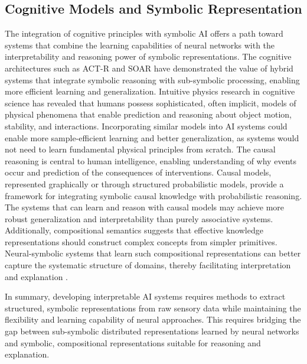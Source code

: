 \documentclass[12pt,a4paper]{report}
\begin{document}
\subsection{Cognitive Models and Symbolic Representation}
The integration of cognitive principles with symbolic AI offers a path toward systems that combine the learning capabilities of neural networks with the interpretability and reasoning power of symbolic representations. The cognitive architectures such as ACT-R \cite{chiave28} and SOAR \cite{chiave29} have demonstrated the value of hybrid systems that integrate symbolic reasoning with sub-symbolic processing, enabling more efficient learning and generalization.
Intuitive physics research in cognitive science has revealed that humans possess sophisticated, often implicit, models of physical phenomena that enable prediction and reasoning about object motion, stability, and interactions. Incorporating similar models into AI systems could enable more sample-efficient learning and better generalization, as systems would not need to learn fundamental physical principles from scratch.
The causal reasoning is central to human intelligence, enabling understanding of why events occur and prediction of the consequences of interventions. Causal models, represented graphically or through structured probabilistic models, provide a framework for integrating symbolic causal knowledge with probabilistic reasoning. The systems that can learn and reason with causal models may achieve more robust generalization and interpretability than purely associative systems.
Additionally, compositional semantics suggests that effective knowledge representations should construct complex concepts from simpler primitives. Neural-symbolic systems that learn such compositional representations can better capture the systematic structure of domains, thereby facilitating interpretation and explanation \cite{chiave26}.

In summary, developing interpretable AI systems requires methods to extract structured, symbolic representations from raw sensory data while maintaining the flexibility and learning capability of neural approaches. This requires bridging the gap between sub-symbolic distributed representations learned by neural networks and symbolic, compositional representations suitable for reasoning and explanation.
\end{document}
